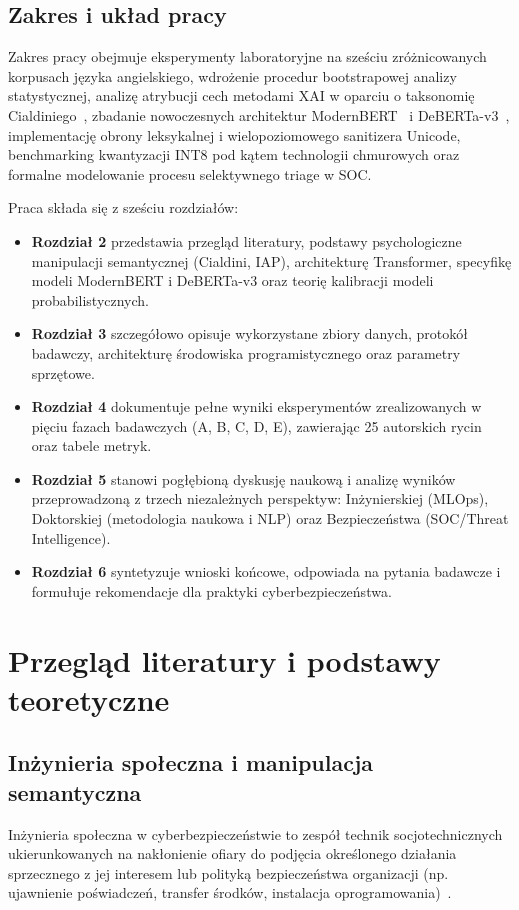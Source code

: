 \documentclass[12pt,a4paper,twoside]{report}
\begin{document}
\section{Zakres i układ pracy}
Zakres pracy obejmuje eksperymenty laboratoryjne na sześciu zróżnicowanych korpusach języka angielskiego, wdrożenie procedur bootstrapowej analizy statystycznej, analizę atrybucji cech metodami XAI w oparciu o taksonomię Cialdiniego~\cite{cialdini2006}, zbadanie nowoczesnych architektur ModernBERT~\cite{modernbert2024} i DeBERTa-v3~\cite{deberta2023}, implementację obrony leksykalnej i wielopoziomowego sanitizera Unicode, benchmarking kwantyzacji INT8 pod kątem technologii chmurowych oraz formalne modelowanie procesu selektywnego triage w SOC.

Praca składa się z sześciu rozdziałów:
\begin{itemize}[leftmargin=*]
  \item \textbf{Rozdział 2} przedstawia przegląd literatury, podstawy psychologiczne manipulacji semantycznej (Cialdini, IAP), architekturę Transformer, specyfikę modeli ModernBERT i DeBERTa-v3 oraz teorię kalibracji modeli probabilistycznych.
  \item \textbf{Rozdział 3} szczegółowo opisuje wykorzystane zbiory danych, protokół badawczy, architekturę środowiska programistycznego oraz parametry sprzętowe.
  \item \textbf{Rozdział 4} dokumentuje pełne wyniki eksperymentów zrealizowanych w pięciu fazach badawczych (A, B, C, D, E), zawierając 25 autorskich rycin oraz tabele metryk.
  \item \textbf{Rozdział 5} stanowi pogłębioną dyskusję naukową i analizę wyników przeprowadzoną z trzech niezależnych perspektyw: Inżynierskiej (MLOps), Doktorskiej (metodologia naukowa i NLP) oraz Bezpieczeństwa (SOC/Threat Intelligence).
  \item \textbf{Rozdział 6} syntetyzuje wnioski końcowe, odpowiada na pytania badawcze i formułuje rekomendacje dla praktyki cyberbezpieczeństwa.
\end{itemize}

\chapter{Przegląd literatury i podstawy teoretyczne}\label{ch:lit}

\section{Inżynieria społeczna i manipulacja semantyczna}
Inżynieria społeczna w cyberbezpieczeństwie to zespół technik socjotechnicznych ukierunkowanych na nakłonienie ofiary do podjęcia określonego działania sprzecznego z jej interesem lub polityką bezpieczeństwa organizacji (np. ujawnienie poświadczeń, transfer środków, instalacja oprogramowania)~\cite{mitnick2002}.
\end{document}
